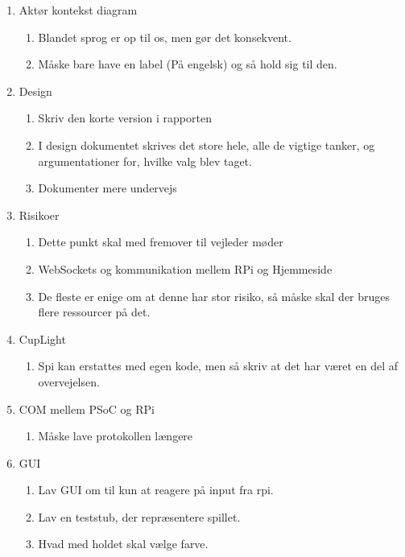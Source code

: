 \begin{enumerate}
    \item Aktør kontekst diagram
    \begin{enumerate}
        \item Blandet sprog er op til os, men gør det konsekvent. 
        \item Måske bare have en label (På engelsk)  og så hold sig til den.
    \end{enumerate}
    \item Design
    \begin{enumerate}
        \item Skriv den korte version i rapporten
        \item I design dokumentet skrives det store hele, alle de vigtige tanker, og argumentationer for, hvilke valg blev taget.
        \item Dokumenter mere undervejs
    \end{enumerate}
    \item Risikoer
    \begin{enumerate}
        \item Dette punkt skal med fremover til vejleder møder
        \item WebSockets og kommunikation mellem RPi og Hjemmeside
        \item De fleste er enige om at denne har stor risiko, så måske skal der bruges flere ressourcer på det.
    \end{enumerate}
    \item CupLight
    \begin{enumerate}
        \item Spi kan erstattes med egen kode, men så skriv at det har været en del af overvejelsen.
    \end{enumerate}
    \item COM mellem PSoC og RPi
    \begin{enumerate}
        \item Måske lave protokollen længere
    \end{enumerate}
    \item GUI
    \begin{enumerate}
        \item Lav GUI om til kun at reagere på input fra rpi.
        \item Lav en teststub, der repræsentere spillet.
        \item Hvad med holdet skal vælge farve.
    \end{enumerate}
\end{enumerate}
